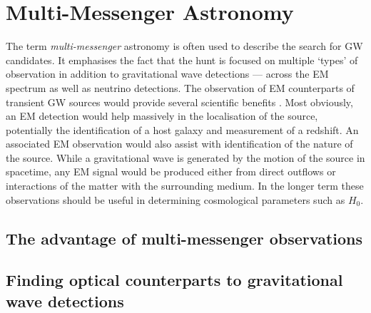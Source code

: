 \section{Multi-Messenger Astronomy}
\label{sec:multi}
\begin{colsection}


\begin{colsection}


The term \emph{multi-messenger} astronomy is often used to describe the search for GW candidates. It emphasises the fact that the hunt is focused on multiple `types' of observation in addition to gravitational wave detections --- across the EM spectrum as well as neutrino detections. The observation of EM counterparts of transient GW sources would provide several scientific benefits \citep{LIGO-EM, LIGO-firstrun-2012}. Most obviously, an EM detection would help massively in the localisation of the source, potentially the identification of a host galaxy and measurement of a redshift. An associated EM observation would also assist with identification of the nature of the source. While a gravitational wave is generated by the motion of the source in spacetime, any EM signal would be produced either from direct outflows or interactions of the matter with the surrounding medium. In the longer term these observations should be useful in determining cosmological parameters such as $H_0$.

\end{colsection}


\subsection{The advantage of multi-messenger observations}
\label{sec:mma_advantages}
\begin{colsection}


\end{colsection}


\subsection{Finding optical counterparts to gravitational wave detections}
\label{sec:followup}
\begin{colsection}


\end{colsection}
\end{colsection}
